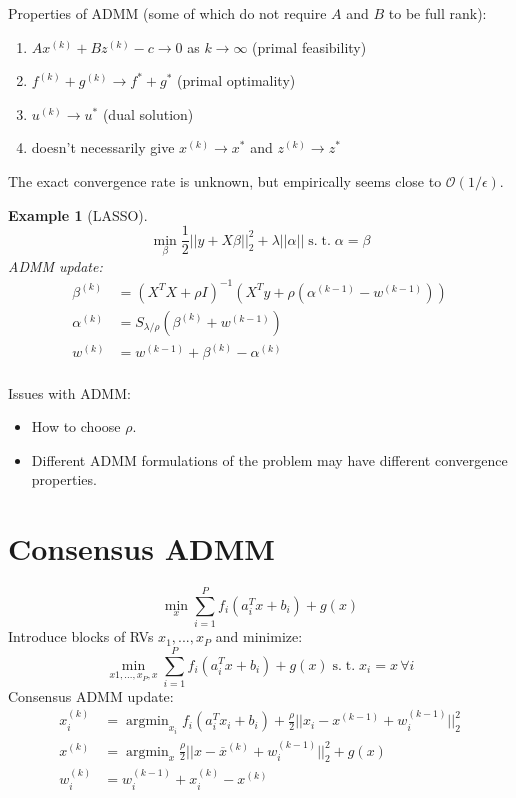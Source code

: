 \documentclass[10pt]{article}
\newtheorem{example}[ex]{Example}
\DeclareMathOperator*{\argmin}{argmin}
\renewcommand{\O}{\ensuremath{\mathcal{O}}}
\newcommand{\st}{\ensuremath{\;\mathrm{s.}\;\mathrm{t.}\;}}
\begin{document}
Properties of ADMM (some of which do not require $A$ and $B$ to be full rank):
\begin{enumerate}
  \item $Ax^{(k)}+Bz^{(k)}-c\to 0$ as $k\to\infty$ (primal feasibility)
\item $f^{(k)}+g^{(k)}\to f^*+g^*$ (primal optimality)
\item $u^{(k)}\to u^*$ (dual solution)
\item doesn't necessarily give $x^{(k)}\to x^*$ and $z^{(k)}\to z^*$
\end{enumerate}

The exact convergence rate is unknown, but empirically seems close to $\O(1/\epsilon)$.

\begin{example}[LASSO]
\[  \min_\beta \frac{1}{2}||y+X\beta||_2^2+\lambda||\alpha|| \st \alpha=\beta \]
ADMM update:
\begin{align*} %
  \beta^{(k)}&=\left(X^TX+\rho I\right)^{-1}\left(X^Ty+\rho(\alpha^{(k-1)}-w^{(k-1)})\right)\\ 
  \alpha^{(k)}&=S_{\lambda/\rho}(\beta^{(k)}+w^{(k-1)})\\
  w^{(k)}&=w^{(k-1)}+\beta^{(k)}-\alpha^{(k)}\\
\end{align*}
\end{example}
Issues with ADMM:
\begin{itemize}
\item How to choose $\rho$.
\item Different ADMM formulations of the problem may have different convergence properties.
  \end{itemize}

\section{Consensus ADMM}
\[ \min_x\sum_{i=1}^Pf_i(a_i^Tx+b_i)+g(x) \]
Introduce blocks of RVs $x_1,...,x_P$ and minimize: \[\min_{x1,...,x_P,x}\sum_{i=1}^Pf_i(a_i^Tx+b_i)+g(x)\st x_i=x\,\forall i\]
Consensus ADMM update:
\begin{align*}
  x_i^{(k)}&=\argmin_{x_i}f_i(a_i^Tx_i+b_i)+\frac{\rho}{2}||x_i-x^{(k-1)}+w_i^{(k-1)}||_2^2\\
x^{(k)}&=\argmin_{x}\frac{\rho}{2}||x-\overline{x}^{(k)}+w_i^{(k-1)}||_2^2 + g(x)\\
w_i^{(k)}&=w_i^{(k-1)}+x_i^{(k)}-x^{(k)}\\
\end{align*}
\end{document}
